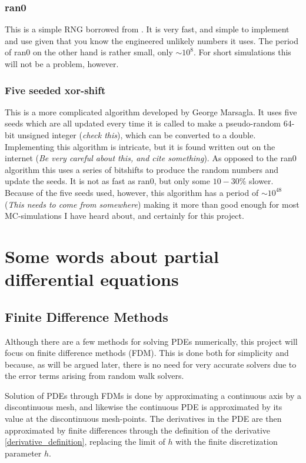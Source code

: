 \subsubsection{ran0}

This is a simple RNG borrowed from \cite{hjorth2011computational}. 
It is very fast, and simple to implement and use given that you know the engineered unlikely numbers it uses. 
The period of ran0 on the other hand is rather small, only $\sim 10^8$. For short simulations this will not be a problem, however.

\subsubsection{Five seeded xor-shift}

This is a more complicated algorithm developed by George Marsagla. 
It uses five seeds which are all updated every time it is called to make a pseudo-random 64-bit unsigned integer (\emph{check this}), which can be converted to a double. 
Implementing this algorithm is intricate, but it is found written out on the internet (\emph{Be very careful about this, and cite something}). 
As opposed to the ran0 algorithm this uses a series of bitshifts to produce the random numbers and update the seeds. 
It is not as fast as ran0, but only some $10-30\%$ slower. 
Because of the five seeds used, however, this algorithm has a period of $\sim10^{48}$ (\emph{This needs to come from somewhere}) making it more than good enough for most MC-simulations I have heard about, and certainly for this project.

\section{Some words about partial differential equations}\label{some_words_on_PDEs}

\subsection{Finite Difference Methods}\label{finite_difference_methods}

Although there are a few methods for solving PDEs numerically, this project will focus on finite difference methods (FDM). 
This is done both for simplicity and because, as will be argued later, there is no need for very accurate solvers due to the error terms arising from random walk solvers. 

Solution of PDEs through FDMs is done by approximating a continuous axis by a discontinuous mesh, and likewise the continuous PDE is approximated by its value at the discontinuous mesh-points. 
The derivatives in the PDE are then approximated by finite differences through the definition of the derivative \eqref{derivative_definition}, replacing the limit of $h$ with the  finite discretization parameter $h$.

